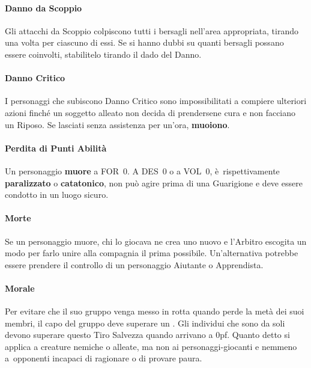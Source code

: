 \documentclass[itdr]{subfiles}
\begin{document}
\vfill
\paragraph{Danno da Scoppio}
Gli attacchi da Scoppio colpiscono tutti i bersagli \mbox{nell’area} appropriata, tirando una volta per ciascuno di essi. Se si hanno dubbi su quanti bersagli possano essere coinvolti, stabilitelo tirando il dado del Danno.

\vfill
\paragraph{Danno Critico}
I personaggi che subiscono Danno Critico sono impossibilitati a compiere ulteriori azioni finché un soggetto alleato non decida di prendersene cura e non facciano un Riposo. Se lasciati senza assistenza per un’ora, \textbf{muoiono}.

\vfill
\paragraph{Perdita di Punti Abilità}
Un personaggio \textbf{muore} a FOR~0. A DES~0 o a VOL~0, è~\mbox{rispettivamente} \textbf{paralizzato} o \textbf{catatonico}, non può \mbox{agire} prima di una Guarigione e deve essere condotto in un luogo sicuro.

\vfill
\paragraph{Morte}
Se un personaggio muore, chi lo giocava ne crea uno nuovo e l’Arbitro escogita un modo per farlo unire alla compagnia il prima possibile. Un'alternativa potrebbe essere prendere il controllo di un personaggio Aiutante o Apprendista.

\vfill
\paragraph{Morale}
Per evitare che il suo gruppo venga messo in rotta quando perde la metà dei suoi membri, il capo del gruppo deve superare un . Gli individui che sono da soli devono superare questo Tiro Salvezza quando arrivano a 0pf. Quanto detto si applica a creature nemiche o alleate, ma non ai personaggi-giocanti e nemmeno a~opponenti incapaci di ragionare o di provare paura.
\end{document}
